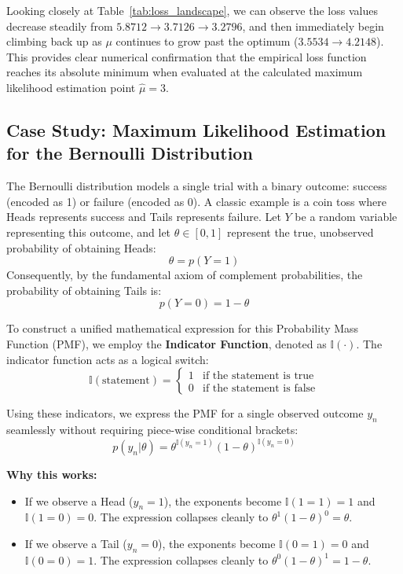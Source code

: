 \documentclass{article}
\begin{document}
Looking closely at Table~\ref{tab:loss_landscape}, we can observe the loss values decrease steadily from $5.8712 \to 3.7126 \to 3.2796$, and then immediately begin climbing back up as $\mu$ continues to grow past the optimum ($3.5534 \to 4.2148$). This provides clear numerical confirmation that the empirical loss function reaches its absolute minimum when evaluated at the calculated maximum likelihood estimation point $\hat{\mu} = 3$.

\subsection{Case Study: Maximum Likelihood Estimation for the Bernoulli Distribution}

The Bernoulli distribution models a single trial with a binary outcome: success (encoded as 1) or failure (encoded as 0). A classic example is a coin toss where Heads represents success and Tails represents failure. Let $Y$ be a random variable representing this outcome, and let $\theta \in [0, 1]$ represent the true, unobserved probability of obtaining Heads:
\begin{equation}
\theta = p(Y = 1)
\end{equation}
Consequently, by the fundamental axiom of complement probabilities, the probability of obtaining Tails is:
\begin{equation}
p(Y = 0) = 1 - \theta
\end{equation}

To construct a unified mathematical expression for this Probability Mass Function (PMF), we employ the \textbf{Indicator Function}, denoted as $\mathbb{I}(\cdot)$. The indicator function acts as a logical switch:
\begin{equation}
\mathbb{I}(\text{statement}) = 
\begin{cases} 
1 & \text{if the statement is true} \\ 
0 & \text{if the statement is false} 
\end{cases}
\end{equation}

Using these indicators, we express the PMF for a single observed outcome $y_n$ seamlessly without requiring piece-wise conditional brackets:
\begin{equation}
p(y_n | \theta) = \theta^{\mathbb{I}(y_n = 1)} (1 - \theta)^{\mathbb{I}(y_n = 0)}
\end{equation}

\textbf{Why this works:} 
\begin{itemize}
    \item If we observe a Head ($y_n = 1$), the exponents become $\mathbb{I}(1=1) = 1$ and $\mathbb{I}(1=0) = 0$. The expression collapses cleanly to $\theta^1 (1-\theta)^0 = \theta$.
    \item If we observe a Tail ($y_n = 0$), the exponents become $\mathbb{I}(0=1) = 0$ and $\mathbb{I}(0=0) = 1$. The expression collapses cleanly to $\theta^0 (1-\theta)^1 = 1 - \theta$.
\end{itemize}
\end{document}

